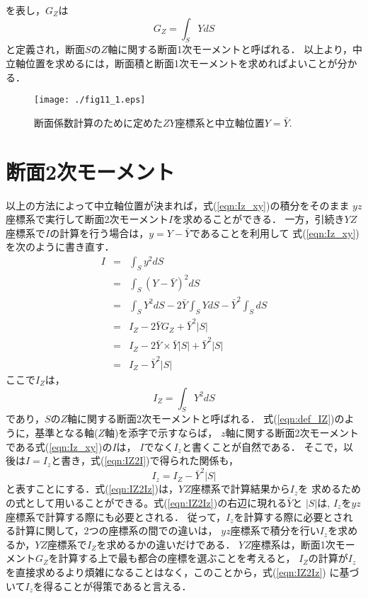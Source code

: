 \documentclass[10pt,a4j]{jarticle}
\begin{document}
を表し，$G_Z$は
\begin{equation}
	G_Z=\int_S YdS 
	\label{eqn:GZ}
\end{equation}
と定義され，断面$S$の$Z$軸に関する断面1次モーメントと呼ばれる．
以上より，中立軸位置を求めるには，断面積と断面1次モーメントを求めればよいことが分かる．
\begin{figure}[h]
	\begin{center}
	\texttt{[image: ./fig11\_1.eps]} 
	\end{center}
	\caption{
		断面係数計算のために定めた$ZY$座標系と中立軸位置$Y=\bar Y$.
	} 
	\label{fig:fig11_1}
\end{figure}
\section{断面2次モーメント}
以上の方法によって中立軸位置が決まれば，式(\ref{eqn:Iz_xy})の積分をそのまま
$yz$座標系で実行して断面2次モーメント$I$を求めることができる．
一方，引続き$YZ$座標系で$I$の計算を行う場合は，$y=Y-\bar{Y}$であることを利用して
式(\ref{eqn:Iz_xy})を次のように書き直す．
\begin{eqnarray}
	I &= &
	\int_S y^2 dS 
	\nonumber \\
	 &= &
	\int_S \left( Y-\bar{Y}\right)^2 dS 
	\nonumber \\
	 &= &
	\int_S Y^2dS -2\bar{Y}\int_S Y dS -\bar Y^2 \int_S dS
	\nonumber \\
	 &= &
	 I_Z-2\bar{Y}G_Z+\bar{Y}^2\left| S \right|
	\nonumber \\
	 &= &
	 I_Z-2\bar{Y}\times \bar{Y}\left| S \right|+\bar{Y}^2 \left| S \right|
	\nonumber \\
	 &= &
	 I_Z-\bar{Y}^2\left| S \right|
	\label{eqn:IZ2I}
\end{eqnarray}
ここで$I_Z$は，
\begin{equation}
	I_Z=\int_S Y^2 dS
	\label{eqn:def_IZ}
\end{equation}
であり，$S$の$Z$軸に関する断面2次モーメントと呼ばれる．
式(\ref{eqn:def_IZ})のように，基準となる軸($Z$軸)を添字で示すならば，
$z$軸に関する断面2次モーメントである式(\ref{eqn:Iz_xy})の$I$は，
$I$でなく$I_z$と書くことが自然である．
そこで，以後は$I=I_z$と書き，式(\ref{eqn:IZ2I})で得られた関係も，
\begin{equation}
	I_z=I_Z-\bar Y^2 \left| S \right|
	\label{eqn:IZ2Iz}
\end{equation}
と表すことにする．式(\ref{eqn:IZ2Iz})は，$YZ$座標系で計算結果から$I_z$を
求めるための式として用いることができる。式(\ref{eqn:IZ2Iz})の右辺に現れる$\bar{Y}$と
$\left| S\right|$は, $I_z$を$yz$座標系で計算する際にも必要とされる．
従って，$I_z$を計算する際に必要とされる計算に関して，2つの座標系の間での違いは，
$yz$座標系で積分を行い$I_z$を求めるか，$YZ$座標系で$I_Z$を求めるかの違いだけである．
$YZ$座標系は，断面1次モーメント$G_Z$を計算する上で最も都合の座標を選ぶことを考えると，
$I_Z$の計算が$I_z$を直接求めるより煩雑になることはなく，このことから，式(\ref{eqn:IZ2Iz})
に基づいて$I_z$を得ることが得策であると言える．
\end{document}
